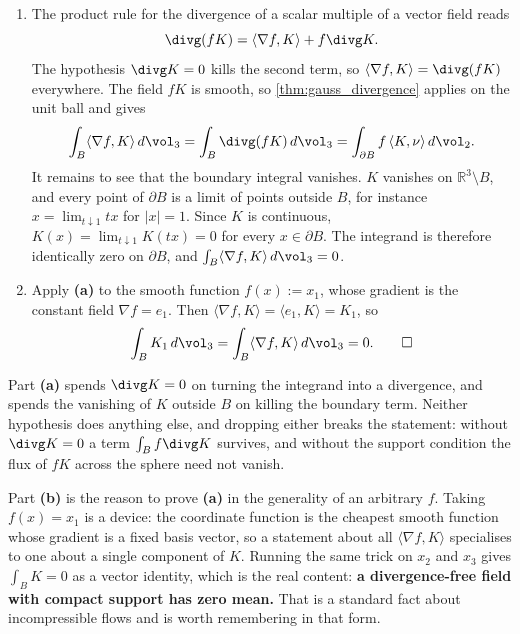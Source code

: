 \begin{exercisesolution}
\label{sol:knoerrer_divergence_free_compact_support}
\begin{enumerate}[label=\textbf{(\alph*)}]
  \item The product rule for the divergence of a scalar multiple of a vector field reads
    \[\divg(fK) = \langle \nabla f, K\rangle + f \divg K.\]
    The hypothesis $\divg K = 0$ kills the second term, so $\langle\nabla f,K\rangle = \divg(fK)$
    everywhere. The field $fK$ is smooth, so \cref{thm:gauss_divergence} applies on the unit ball
    and gives
    \[\int_B \langle\nabla f, K\rangle \,d\vol_3 = \int_B \divg(fK)\,d\vol_3
      = \int_{\partial B} f\,\langle K,\nu\rangle \,d\vol_2 .\]
    It remains to see that the boundary integral vanishes. $K$ vanishes on
    $\mathbb{R}^3\setminus B$, and every point of $\partial B$ is a limit of points outside $B$,
    for instance $x = \lim_{t \downarrow 1} tx$ for $\lvert x\rvert = 1$. Since $K$ is continuous,
    $K(x) = \lim_{t\downarrow1}K(tx) = 0$ for every $x \in \partial B$. The integrand is therefore
    identically zero on $\partial B$, and
    $\int_B \langle\nabla f,K\rangle\,d\vol_3 = 0$.

  \item Apply \textbf{(a)} to the smooth function $f(x) := x_1$, whose gradient is the constant
    field $\nabla f = e_1$. Then $\langle\nabla f,K\rangle = \langle e_1,K\rangle = K_1$, so
    \[\int_B K_1 \,d\vol_3 = \int_B \langle\nabla f,K\rangle\,d\vol_3 = 0.\qedhere\]
\end{enumerate}
\begin{remark}
Part \textbf{(a)} spends $\divg K = 0$ on turning the integrand into a divergence, and spends the
vanishing of $K$ outside $B$ on killing the boundary term. Neither hypothesis does anything else,
and dropping either breaks the statement: without $\divg K = 0$ a term $\int_B f \divg K$ survives,
and without the support condition the flux of $fK$ across the sphere need not vanish.

Part \textbf{(b)} is the reason to prove \textbf{(a)} in the generality of an arbitrary $f$. Taking
$f(x) = x_1$ is a device: the coordinate function is the cheapest smooth function whose gradient is
a fixed basis vector, so a statement about all $\langle\nabla f, K\rangle$ specialises to one about
a single component of $K$. Running the same trick on $x_2$ and $x_3$ gives $\int_B K = 0$ as a
vector identity, which is the real content: \textbf{a divergence-free field with compact support
has zero mean.} That is a standard fact about incompressible flows and is worth remembering in
that form.
\end{remark}
\end{exercisesolution}


